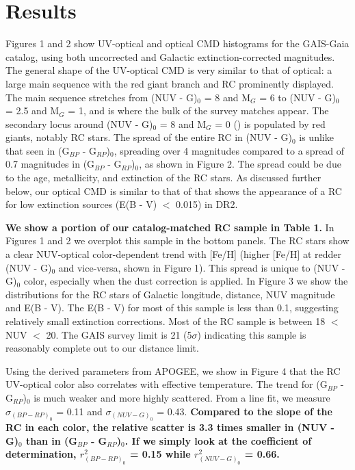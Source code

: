 \documentclass[twocolumn]{emulateapj}
\begin{document}
\section{Results}   
Figures 1 and 2 show UV-optical and optical CMD histograms for the GAIS-Gaia catalog, using both uncorrected and Galactic extinction-corrected magnitudes. The general shape of the UV-optical CMD is very similar to that of optical: a large main sequence with the red giant branch and RC prominently displayed. The main sequence stretches from (NUV - G)$_0$ = 8 and M$_G$ = 6 to (NUV - G)$_0$ = 2.5 and M$_G$ = 1, and is where the bulk of the survey matches appear. The secondary locus around (NUV - G)$_0$ = 8 and M$_G$ = 0 (\citealt{hawkins17}) is populated by red giants, notably RC stars. The spread of the entire RC in (NUV - G)$_0$ is unlike that seen in (G$_{BP}$ - G$_{RP}$)$_0$, spreading over 4 magnitudes compared to a spread of 0.7 magnitudes in (G$_{BP}$ - G$_{RP}$)$_0$, as shown in Figure 2. The spread could be due to the age, metallicity, and extinction of the RC stars. As discussed further below, our optical CMD is similar to that of \citealt{gaiahrd} that shows the appearance of a RC for low extinction sources (E(B - V) $<$ 0.015) in DR2.

\textbf{We show a portion of our catalog-matched RC sample in Table 1.} In Figures 1 and 2 we overplot this sample in the bottom panels. The RC stars show a clear NUV-optical color-dependent trend with [Fe/H] (higher [Fe/H] at redder (NUV - G)$_0$ and vice-versa, shown in Figure 1). This spread is unique to (NUV - G)$_0$ color, especially when the dust correction is applied. In Figure 3 we show the distributions for the RC stars of Galactic longitude, distance, NUV magnitude and E(B - V). The E(B - V) for most of this sample is less than 0.1, suggesting relatively small extinction corrections. Most of the RC sample is between 18 $<$ NUV $<$ 20. The GAIS survey limit is 21 (5$\sigma$) indicating this sample is reasonably complete out to our distance limit. 

Using the derived parameters from APOGEE, we show in Figure 4 that the RC UV-optical color also correlates with effective temperature. The trend for (G$_{BP}$ - G$_{RP}$)$_0$ is much weaker and more highly scattered. From a line fit, we measure $\sigma_{{(BP-RP)}_0}$ = 0.11 and $\sigma_{{(NUV-G)}_0}$ = 0.43. \textbf{Compared to the slope of the RC in each color, the relative scatter is 3.3 times smaller in (NUV - G)$_0$ than in (G$_{BP}$ - G$_{RP}$)$_0$. If we simply look at the coefficient of determination, $r^2_{(BP-RP)_0}$ = 0.15 while $r^2_{(NUV-G)_0}$ = 0.66.}
\end{document}
